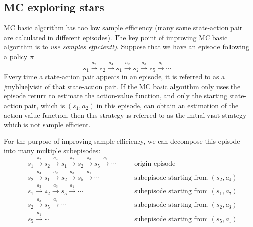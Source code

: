 \subsection{MC exploring stars}
MC basic algorithm has too low sample efficiency (many same state-action pair are calculated in different episodes). The key point of improving
MC basic algorithm is to \emph{use samples efficiently}. Suppose that we have an episode following a policy $\pi$
\begin{equation*}
	s_{1} \stackrel{a_{2}}{\longrightarrow} s_{2} \stackrel{a_{4}}{\longrightarrow} s_{1} \stackrel{a_{2}}{\longrightarrow} s_{2} \stackrel{a_{3}}{\longrightarrow} s_{5} \stackrel{a_{1}}{\longrightarrow} \cdots
\end{equation*}
Every time a state-action pair appears in an episode, it is referred to as a \emph[myblue]{visit} of that state-action pair. If the MC basic algorithm only uses the episode return to estimate the action-value function, and only the starting state-action pair, which is $(s_{1}, a_{2})$ in this episode, can obtain an estimation of the action-value function, then this strategy is referred to as the initial visit strategy which is not sample efficient. \par
For the purpose of improving sample efficiency, we can decompose this episode into many multiple subepisodes:
\begin{align*}
	 &  & s_{1} \stackrel{a_{2}}{\longrightarrow} s_{2} \stackrel{a_{4}}{\longrightarrow} s_{1} \stackrel{a_{2}}{\longrightarrow} s_{2} \stackrel{a_{3}}{\longrightarrow} s_{5} \stackrel{a_{1}}{\longrightarrow} \cdots &  & \  & \text{origin episode}                          \\
	 &  & s_{2} \stackrel{a_{4}}{\longrightarrow} s_{1} \stackrel{a_{2}}{\longrightarrow} s_{2} \stackrel{a_{3}}{\longrightarrow} s_{5} \stackrel{a_{1}}{\longrightarrow} \cdots                                         &  & \  & \text{subepisode starting from } (s_{2},a_{4}) \\
	 &  & s_{1} \stackrel{a_{2}}{\longrightarrow} s_{2} \stackrel{a_{3}}{\longrightarrow} s_{5} \stackrel{a_{1}}{\longrightarrow} \cdots                                                                                 &  & \  & \text{subepisode starting from } (s_{1},a_{2}) \\
	 &  & s_{2} \stackrel{a_{3}}{\longrightarrow} s_{5} \stackrel{a_{1}}{\longrightarrow} \cdots                                                                                                                         &  & \  & \text{subepisode starting from } (s_{2},a_{3}) \\
	 &  & s_{5} \stackrel{a_{1}}{\longrightarrow} \cdots                                                                                                                                                                 &  & \  & \text{subepisode starting from } (s_{5},a_{1})
\end{align*}
